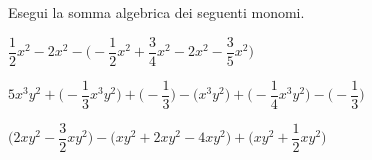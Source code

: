 
\begin{esercizio}
 \label{ese:9.32}
Esegui la somma algebrica dei seguenti monomi.

\begin{enumeratea}
\spazielenx
 \item 
\(\dfrac{1}{2}x^{2}-2x^{2}-\bigg(-{\dfrac{1}{2}}x^{2}+\dfrac{3}{4}x^{2}-2x^{2}
-\dfrac{3}{5}x^{2}\bigg)\)
 \item 
\(5x^{3}y^{2}+\bigg(-{\dfrac{1}{3}}x^{3}y^{2}\bigg)+\bigg(-{\dfrac{1}{3}}
\bigg)-\big(x^{3}y^{2}\big)+\bigg(-{\dfrac{1}{4}}x^{3}y^{2}\bigg)-\bigg(-{\dfrac
{1}{3}}\bigg)\)
 \item 
\(\bigg(2xy^{2}-\dfrac{3}{2}xy^{2}\bigg)-\big(xy^{2}+2xy^{2}-4xy^{2}
\big)+\bigg(xy^{2}+\dfrac{1}{2}xy^{2}\bigg)\)
\end{enumeratea}
\end{esercizio}

\subsubsection*{}


